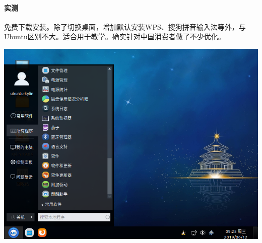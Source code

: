 \paragraph{实测}
免费下载安装。除了切换桌面，增加默认安装WPS、搜狗拼音输入法等外，与Ubuntu区别不大。适合用于教学。确实针对中国消费者做了不少优化。
\begin{center}
	\includegraphics[scale=0.4]{pic/uk}
\end{center} \par
